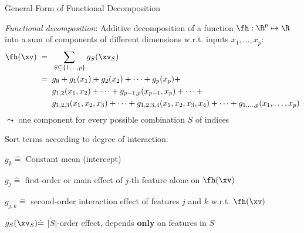 \documentclass[10pt,compress,t,notes=noshow, xcolor=table]{beamer}
\newcommand{\open}{}
\newcommand{\close}{}
\begin{document}
\begin{framev}[align=top]{General Form of Functional Decomposition
}
\begin{definition}
\textit{Functional decomposition}: Additive decomposition of a function $\fh: \R^p \mapsto \R$ into a sum of components of different dimensions w.r.t. inputs $x_1, \ldots, x_p$: 
\begin{equation*}
\begin{split}
\fh(\xv)
\; = \; \; & \sum_{S \subseteq \{1,\ldots,p\}} g_{S}(\xv_S) \\
\; = \; \; & g_{\open \emptyset \close} +
g_{\open 1 \close}(x_1) + g_{\open 2 \close}(x_2) + \dots + g_{\open p \close}(x_p) + \\
& g_{\open 1, 2 \close}(x_1, x_2) + \dots + g_{\open p-1, p \close}(x_{p-1}, x_p) + \dots + \\
& g_{\open 1, 2, 3 \close}(x_1, x_2, x_3) + \dots +
g_{\open 1, 2, 3, 4 \close}(x_1, x_2, x_3, x_4) + \dots +
g_{\open 1,\ldots,p \close}(x_1, \ldots, x_p)
\end{split}    
\end{equation*}
$\leadsto$ one component for every possible combination $S$ of indices
\end{definition}
Sort terms according to degree of interaction:
\begin{itemizeM}
\item $g_{\open \emptyset \close} \hat = $ Constant mean (intercept) %
\item $g_{\open j \close} \hat = $ first-order or main effect of $j$-th feature alone on $\fh(\xv)$
\item $g_{\open j, k \close} \hat = $ second-order interaction effect of features $j$ and $k$ w.r.t. $\fh(\xv)$%
\item $g_{S}(\xv_S) \hat = $ $|S|$-order effect, depends \textbf{only} on features in $S$ %
\end{itemizeM}
\end{framev}
\end{document}
